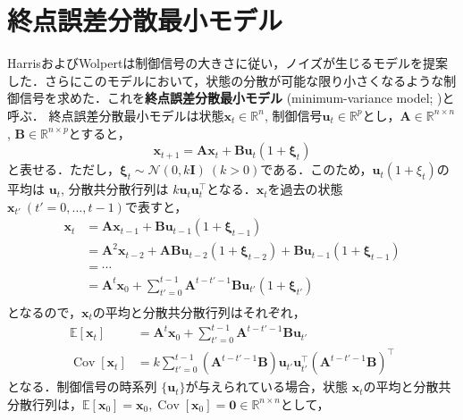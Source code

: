 \section{終点誤差分散最小モデル}
HarrisおよびWolpertは制御信号の大きさに従い，ノイズが生じるモデルを提案した．さらにこのモデルにおいて，状態の分散が可能な限り小さくなるような制御信号を求めた．これを\textbf{終点誤差分散最小モデル} (minimum-variance model; \citep{Harris1998-gj})と呼ぶ．
終点誤差分散最小モデルは状態$\mathbf{x}_t\in \mathbb{R}^n$, 制御信号$\mathbf{u}_t \in \mathbb{R}^p$とし，$\mathbf{A}\in \mathbb{R}^{n\times n}$, $\mathbf{B}\in \mathbb{R}^{n \times p}$とすると，
\begin{equation}
\mathbf{x}_{t+1} = \mathbf{A} \mathbf{x}_t + \mathbf{B}\mathbf{u}_t (1+\boldsymbol{\xi}_t)
\end{equation}
と表せる．ただし，$\boldsymbol{\xi}_t \sim \mathcal{N}(0, k\mathbf{I})\ (k>0)$である．このため，$\mathbf{u}_t (1+\xi_t)$の平均は $\mathbf{u}_t$, 分散共分散行列は $k\mathbf{u}_t \mathbf{u}_t^\top$となる．$\mathbf{x}_t$を過去の状態 $\mathbf{x}_{t'}\ (t'=0, \ldots, t-1)$で表すと，
\begin{align}
\mathbf{x}_{t} &= \mathbf{A} \mathbf{x}_{t-1} + \mathbf{B}\mathbf{u}_{t-1} (1+\boldsymbol{\xi}_{t-1})\\
&=\mathbf{A}^2 \mathbf{x}_{t-2} + \mathbf{A}\mathbf{B}\mathbf{u}_{t-2} (1+\boldsymbol{\xi}_{t-2}) + \mathbf{B}\mathbf{u}_{t-1} (1+\boldsymbol{\xi}_{t-1})\\
&=\cdots\\
&=\mathbf{A}^{t} \mathbf{x}_{0} + \sum_{t'=0}^{t-1} \mathbf{A}^{t-t'-1}\mathbf{B}\mathbf{u}_{t'} (1+\boldsymbol{\xi}_{t'})\\
\end{align}
となるので，$\mathbf{x}_t$の平均と分散共分散行列はそれぞれ，
\begin{align}
\mathbb{E}\left[\mathbf{x}_{t}\right]&=\mathbf{A}^{t} \mathbf{x}_{0}+\sum_{t'=0}^{t-1} \mathbf{A}^{t-t'-1} \mathbf{B} \mathbf{u}_{t'}\\
\operatorname{Cov}\left[\mathbf{x}_{t}\right]&=k\sum_{t'=0}^{t-1}\left(\mathbf{A}^{t-t'-1} \mathbf{B}\right) \mathbf{u}_{t'} \mathbf{u}_{t'}^\top \left(\mathbf{A}^{t-t'-1} \mathbf{B}\right)^{\top}
\end{align}
となる．制御信号の時系列 $\{\mathbf{u}_t\}$が与えられている場合，状態 $\mathbf{x}_t$の平均と分散共分散行列は，$\mathbb{E}\left[\mathbf{x}_{0}\right]=\mathbf{x}_0, \operatorname{Cov}\left[\mathbf{x}_{0}\right]=\mathbf{0}\in\mathbb{R}^{n\times n}$として，
